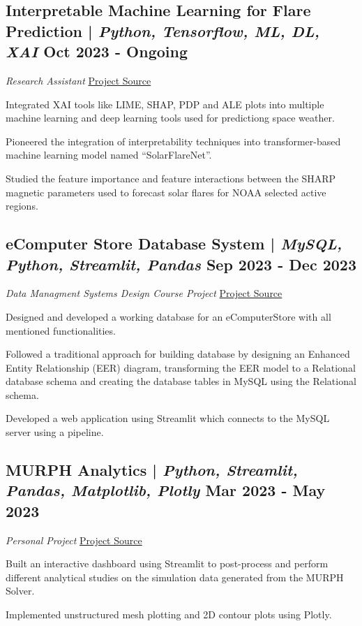 \subsection{{Interpretable Machine Learning for Flare Prediction | \textit{Python, Tensorflow, ML, DL, XAI} \hfill Oct 2023 - Ongoing}}
{\textit{Research Assistant} \hfill \href{https://github.com/vinay-ram1999/SolarFlareNet}{Project Source}}
\begin{zitemize}
\item {Integrated XAI tools like LIME, SHAP, PDP and ALE plots into multiple machine learning and deep learning tools used for predictiong space weather.}
\item {Pioneered the integration of interpretability techniques into transformer-based machine learning model named ``SolarFlareNet''.}
\item {Studied the feature importance and feature interactions between the SHARP magnetic parameters used to forecast solar flares for NOAA selected active regions.}
\end{zitemize}


\subsection{{eComputer Store Database System | \textit{MySQL, Python, Streamlit, Pandas} \hfill Sep 2023 - Dec 2023}}
{\textit{Data Managment Systems Design Course Project} \hfill \href{https://github.com/vinay-ram1999/CS631-DMSD}{Project Source}}
\begin{zitemize}
\item {Designed and developed a working database for an eComputerStore with all mentioned functionalities.}
\item {Followed a traditional approach for building database by designing an Enhanced Entity Relationship (EER) diagram, transforming the EER model to a Relational database schema and creating the database tables in MySQL using the Relational schema.}
\item {Developed a web application using Streamlit which connects to the MySQL server using a pipeline.}
\end{zitemize}


\subsection{{MURPH Analytics | \textit{Python, Streamlit, Pandas, Matplotlib, Plotly} \hfill Mar 2023 - May 2023}}
{\textit{Personal Project} \hfill \href{https://murph-postprocess.streamlit.app}{Project Source}}
\begin{zitemize}
\item {Built an interactive dashboard using Streamlit to post-process and perform different analytical studies on the simulation data generated from the MURPH Solver.}
\item {Implemented unstructured mesh plotting and 2D contour plots using Plotly.}
\end{zitemize}



